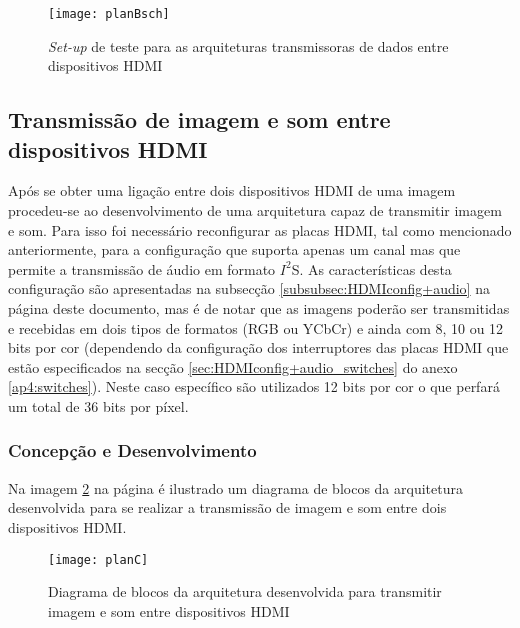 \begin{figure}[h!]
	\begin{center}
		\leavevmode
		\texttt{[image: planBsch]}
		\caption{\textit{Set-up} de teste para as arquiteturas transmissoras de dados entre dispositivos HDMI}
		\label{fig:planb_sch}
	\end{center}
\end{figure}

\subsection{Transmissão de imagem e som entre dispositivos HDMI}

Após se obter uma ligação entre dois dispositivos HDMI de uma imagem procedeu-se ao desenvolvimento de uma arquitetura capaz de transmitir imagem e som. Para isso foi necessário reconfigurar as placas HDMI, tal como mencionado anteriormente, para a configuração que suporta apenas um canal mas que permite a transmissão de áudio em formato $I^{2}$S. As características desta configuração são apresentadas na subsecção \ref{subsubsec:HDMIconfig+audio} na página \pageref{subsubsec:HDMIconfig+audio} deste documento, mas é de notar que as imagens poderão ser transmitidas e recebidas em dois tipos de formatos (RGB ou YCbCr) e ainda com 8, 10 ou 12 bits por cor (dependendo da configuração dos interruptores das placas HDMI que estão especificados na secção \ref{sec:HDMIconfig+audio_switches} do anexo \ref{ap4:switches}). Neste caso específico são utilizados 12 bits por cor o que perfará um total de 36 bits por píxel.

\subsubsection*{Concepção e Desenvolvimento}

Na imagem \ref{fig:planC} na página \pageref{fig:planC} é ilustrado um diagrama de blocos da arquitetura desenvolvida para se realizar a transmissão de imagem e som entre dois dispositivos HDMI. 

\begin{figure}[h!]
	\begin{center}
		\leavevmode
		\texttt{[image: planC]}
		\caption{Diagrama de blocos da arquitetura desenvolvida para transmitir imagem e som entre dispositivos HDMI}
		\label{fig:planC}
	\end{center}
\end{figure}

